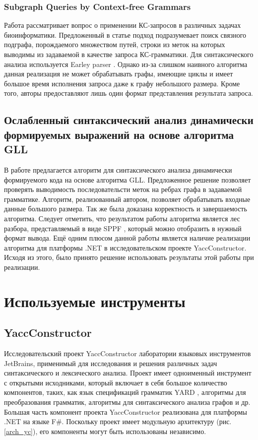 \documentclass{spisok-article}
\begin{document}
		\subsubsection*{Subgraph Queries by Context-free Grammars}
		    Работа \cite{subgraph} рассматривает вопрос о применении КС-запросов в различных задачах биоинформатики. Предложенный в статье подход подразумевает поиск связного подграфа, порождаемого множеством путей, строки из меток на которых выводимы из задаваемой в качестве запроса КС-грамматики. Для синтаксического анализа используется Earley parser \cite{hale2001probabilistic}. Однако из-за слишком наивного алгоритма данная реализация не может обрабатывать графы, имеющие циклы и имеет большое время исполнения запроса даже к графу небольшого размера. Кроме того, авторы предоставляют лишь один формат представления результата запроса.
        \subsection*{Ослабленный синтаксический анализ динамически формируемых выражений на основе алгоритма GLL}
	        В работе \cite{rag} предлагается алгоритм для синтаксического анализа динамически формируемого кода на основе алгоритма GLL. Предложенное решение позволяет проверять выводимость последовательсти меток на ребрах графа в задаваемой грамматике. Алгоритм, реализованный автором, позволяет обрабатывать входные данные большого размера. Так же была доказана корректность и завершаемость алгоритма. Следует отметить, что результатом работы алгоритма является лес разбора, представляемый в виде SPPF \cite{SPPF}, который можно отобразить в нужный формат вывода. Ещё одним плюсом данной работы является наличие реализации алгоритма для платформы .NET в исследовательском проекте YaccConstructor. Исходя из этого, было принято решение использовать результаты этой работы при реализации.
    
\section{Используемые инструменты}
    \subsection*{YaccConstructor}	
    Исследовательский проект YaccConstructor лаборатории языковых инструментов JetBrains, применимый для исследования и решения различных задач синтаксического и лексического анализа. Проект имеет одноименный инструмент с открытыми исходниками, который включает в себя большое количество компонентов, таких, как язык спецификаций грамматик YARD \cite{YARD}, алгоритмы для преобразования грамматик, алгоритмы для синтаксического анализа графов и др. Большая часть компонент проекта YaccConstructor реализована для платформы .NET на языке F\#. Поскольку проект имеет модульную архитектуру (рис.\ref{arch_yc}), его компоненты могут быть использованы независимо.
	    
\end{document}
